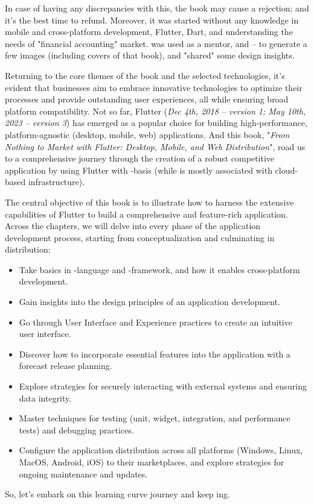 \noindent In case of having any discrepancies with this, the book may cause a rejection; and it's the best time to 
refund. Moreover, it was started without any knowledge in mobile and cross-platform development, Flutter, Dart, and 
understanding the needs of "financial accounting" market.  was used as a mentor, and  --
to generate a few images (including covers of that book), and "shared" some design insights.

Returning to the core themes of the book and the selected technologies, it's evident that businesses aim to embrace 
innovative technologies to optimize their processes and provide outstanding user experiences, all while ensuring 
broad platform compatibility. Not so far, Flutter (\emph{Dec 4th, 2018 -- version 1; May 10th, 2023 -- version 3}) 
has emerged as a popular choice for building high-performance, platform-agnostic (desktop, mobile, web) applications. 
And this book, "\emph{From Nothing to Market with Flutter: Desktop, Mobile, and Web Distribution}", road us to a 
comprehensive journey through the creation of a robust competitive application by using Flutter with 
-basis (while  is mostly associated with cloud-based infrastructure).

The central objective of this book is to illustrate how to harness the extensive capabilities of Flutter to build a 
comprehensive and feature-rich application. Across the chapters, we will delve into every phase of the application 
development process, starting from conceptualization and culminating in distribution:

\begin{itemize}
    \item Take basics in -language and -framework, and how it enables cross-platform development.

    \item Gain insights into the design principles of an application development. 
    
    \item Go through User Interface and Experience practices to create an intuitive user interface.

    \item Discover how to incorporate essential features into the application with a forecast release planning.

    \item Explore strategies for securely interacting with external systems and ensuring data integrity.

    \item Master techniques for testing (unit, widget, integration, and performance tests) and debugging practices. 

    \item Configure the application distribution across all platforms (Windows, Linux, MacOS, Android, iOS) to their 
    marketplaces, and explore strategies for ongoing maintenance and updates.
\end{itemize}

\noindent So, let's embark on this learning curve journey and keep ing.
